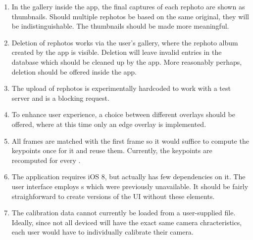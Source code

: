 \begin{enumerate}
   \item In the gallery inside the app, the final captures of each rephoto are
      shown as thumbnails. Should multiple rephotos be based on the same
      original, they will be indistinguishable. The thumbnails should be made
      more meaningful.

   \item Deletion of rephotos works via the user's gallery, where the rephoto
      album created by the app is visible. Deletion will leave invalid entries
      in the database which should be cleaned up by the app. More reasonably
      perhaps, deletion should be offered inside the app.


   \item The upload of rephotos is experimentally hardcoded to work with a test
      server and is a blocking request.

   \item To enhance user experience, a choice between different overlays should
      be offered, where at this time only an edge overlay is implemented.

   \item All frames are matched with the first frame so it would suffice to
      compute the keypoints once for it and reuse them. Currently, the keypoints
      are recomputed for every .

   \item The application requires iOS 8, but actually has few dependencies on
      it. The user interface employs s which were
      previously unavailable. It should be fairly straighforward to create
      versions of the UI without these elements.

   \item The calibration data cannot currently be loaded from a user-supplied
      file. Ideally, since not all deviced will have the exact same camera
      chracteristics, each user would have to individually calibrate their
      camera.


\end{enumerate}
